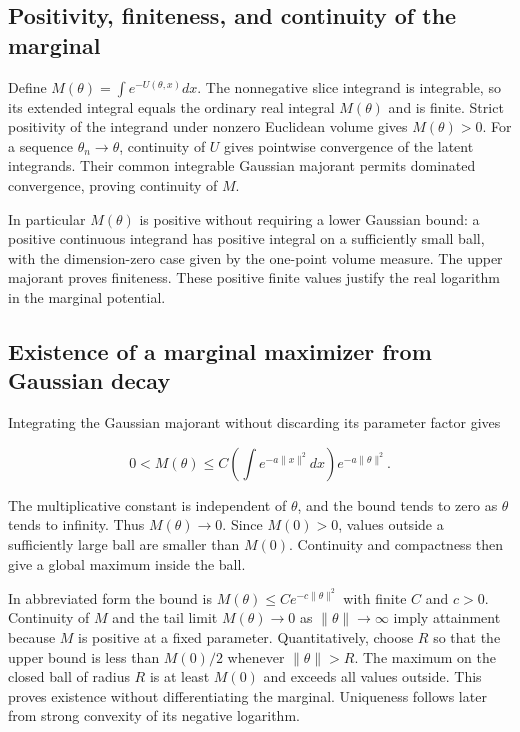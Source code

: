 \documentclass[11pt,a4paper]{article}
\begin{document}
\subsection{\texorpdfstring{Positivity, finiteness, and continuity of the marginal}{Positivity, finiteness, and continuity of the marginal}}


Define \(M(\theta)=\int e^{-U(\theta,x)}dx\). The nonnegative slice integrand is integrable, so its extended integral equals the ordinary real integral \(M(\theta)\) and is finite. Strict positivity of the integrand under nonzero Euclidean volume gives \(M(\theta)>0\). For a sequence \(\theta_n\to\theta\), continuity of \(U\) gives pointwise convergence of the latent integrands. Their common integrable Gaussian majorant permits dominated convergence, proving continuity of \(M\).



In particular \(M(\theta)\) is positive without requiring a lower Gaussian bound: a positive continuous integrand has positive integral on a sufficiently small ball, with the dimension-zero case given by the one-point volume measure. The upper majorant proves finiteness. These positive finite values justify the real logarithm in the marginal potential.



\subsection{\texorpdfstring{Existence of a marginal maximizer from Gaussian decay}{Existence of a marginal maximizer from Gaussian decay}}


Integrating the Gaussian majorant without discarding its parameter factor gives

\[0<M(\theta)\le C\left(\int e^{-a\|x\|^2}dx\right)e^{-a\|\theta\|^2}.\]

The multiplicative constant is independent of \(\theta\), and the bound tends to zero as \(\theta\) tends to infinity. Thus \(M(\theta)\to0\). Since \(M(0)>0\), values outside a sufficiently large ball are smaller than \(M(0)\). Continuity and compactness then give a global maximum inside the ball.



In abbreviated form the bound is \(M(\theta)\le C e^{-c\|\theta\|^2}\) with finite \(C\) and \(c>0\). Continuity of \(M\) and the tail limit \(M(\theta)\to0\) as \(\|\theta\|\to\infty\) imply attainment because \(M\) is positive at a fixed parameter. Quantitatively, choose \(R\) so that the upper bound is less than \(M(0)/2\) whenever \(\|\theta\|>R\). The maximum on the closed ball of radius \(R\) is at least \(M(0)\) and exceeds all values outside. This proves existence without differentiating the marginal. Uniqueness follows later from strong convexity of its negative logarithm.
\end{document}
